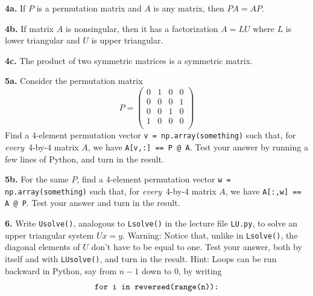 \documentclass[11pt]{article}
\begin{document}
\par\medskip
{\bf 4a.}
If $P$ is a permutation matrix and $A$ is any matrix, then $PA=AP$.

\par\medskip
{\bf 4b.}
If matrix $A$ is nonsingular, then it has a factorization $A=LU$
where $L$ is lower triangular and $U$ is upper triangular.

\par\medskip
{\bf 4c.}
The product of two symmetric matrices is a symmetric matrix.

\newpage
\par\bigskip
{\bf 5a.} Consider the permutation matrix 
$$P =
   \left(
   \begin{array}{cccc}
    0 & 1 & 0 & 0 \\ 	
    0 & 0 & 0 & 1 \\ 	
    0 & 0 & 1 & 0 \\ 	
    1 & 0 & 0 & 0 \\ 	
   \end{array} \right)
$$
Find a 4-element permutation vector {\tt v = np.array(something)}
such that, for {\em every}\, 4-by-4 matrix $A$, 
we have {\tt A[v,:] == P @ A}.
Test your answer by running a few lines of Python, 
and turn in the result.

\par\medskip
{\bf 5b.} For the same $P$, 
find a 4-element permutation vector {\tt w = np.array(something)}
such that, for {\em every}\, 4-by-4 matrix $A$, 
we have {\tt A[:,w] == A @ P}. 
Test your answer and turn in the result.

\par\bigskip
{\bf 6.}
Write {\tt Usolve()}, analogous to {\tt Lsolve()} in 
the lecture file {\tt LU.py},
to solve an upper triangular system $Ux=y$. 
Warning: Notice that, unlike in {\tt Lsolve()}, 
the diagonal elements of $U$ don't have to be equal to one.
Test your answer, both by itself and with {\tt LUsolve()},
and turn in the result.
Hint: Loops can be run backward in Python, 
say from $n-1$ down to $0$, by writing
$$\mbox{\tt for i in reversed(range(n)):}$$
\end{document}
